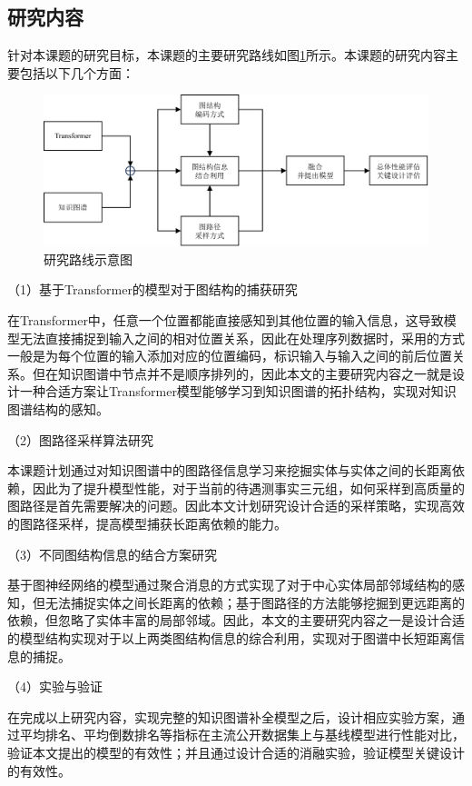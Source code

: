 \subsection{研究内容}


针对本课题的研究目标，本课题的主要研究路线如图\ref{research_route}所示。本课题的研究内容主要包括以下几个方面：

\begin{figure}[htb]
  \centerline{\includegraphics[width=1\textwidth]{pic/research_route.pdf}}
  \caption{研究路线示意图}
  \label{research_route}
\end{figure}

（1）基于Transformer的模型对于图结构的捕获研究

在Transformer中，任意一个位置都能直接感知到其他位置的输入信息，这导致模型无法直接捕捉到输入之间的相对位置关系，因此在处理序列数据时，采用的方式一般是为每个位置的输入添加对应的位置编码，标识输入与输入之间的前后位置关系。但在知识图谱中节点并不是顺序排列的，因此本文的主要研究内容之一就是设计一种合适方案让Transformer模型能够学习到知识图谱的拓扑结构，实现对知识图谱结构的感知。

（2）图路径采样算法研究

本课题计划通过对知识图谱中的图路径信息学习来挖掘实体与实体之间的长距离依赖，因此为了提升模型性能，对于当前的待遇测事实三元组，如何采样到高质量的图路径是首先需要解决的问题。因此本文计划研究设计合适的采样策略，实现高效的图路径采样，提高模型捕获长距离依赖的能力。

（3）不同图结构信息的结合方案研究

基于图神经网络的模型通过聚合消息的方式实现了对于中心实体局部邻域结构的感知，但无法捕捉实体之间长距离的依赖；基于图路径的方法能够挖掘到更远距离的依赖，但忽略了实体丰富的局部邻域。因此，本文的主要研究内容之一是设计合适的模型结构实现对于以上两类图结构信息的综合利用，实现对于图谱中长短距离信息的捕捉。

（4）实验与验证

在完成以上研究内容，实现完整的知识图谱补全模型之后，设计相应实验方案，通过平均排名、平均倒数排名等指标在主流公开数据集上与基线模型进行性能对比，验证本文提出的模型的有效性；并且通过设计合适的消融实验，验证模型关键设计的有效性。

